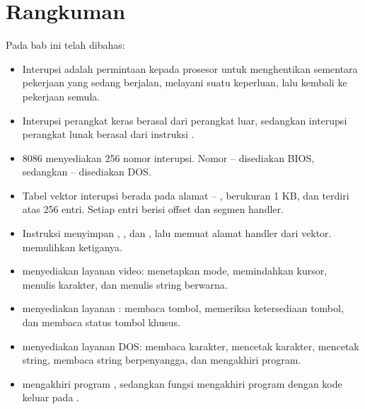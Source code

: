 \section{Rangkuman}
\label{sec:rangkuman-bab9}

Pada bab ini telah dibahas:

\begin{itemize}
    \item Interupsi adalah permintaan kepada prosesor untuk
          menghentikan sementara pekerjaan yang sedang berjalan,
          melayani suatu keperluan, lalu kembali ke pekerjaan semula.

    \item Interupsi perangkat keras berasal dari perangkat luar,
          sedangkan interupsi perangkat lunak berasal dari instruksi
          .

    \item 8086 menyediakan 256 nomor interupsi. Nomor --
           disediakan BIOS, sedangkan --
          disediakan DOS.

    \item Tabel vektor interupsi berada pada alamat --
          , berukuran 1 KB, dan terdiri atas 256 entri.
          Setiap entri berisi offset dan segmen handler.

    \item Instruksi  menyimpan , ,
          dan , lalu memuat alamat handler dari vektor.
           memulihkan ketiganya.

    \item {} menyediakan layanan video: menetapkan mode,
          memindahkan kursor, menulis karakter, dan menulis string
          berwarna.

    \item {} menyediakan layanan : membaca
          tombol, memeriksa ketersediaan tombol, dan membaca status
          tombol khusus.

    \item {} menyediakan layanan DOS: membaca karakter,
          mencetak karakter, mencetak string, membaca string
          berpenyangga, dan mengakhiri program.

    \item {} mengakhiri program , sedangkan
           fungsi  mengakhiri program dengan
          kode keluar pada .
\end{itemize}

